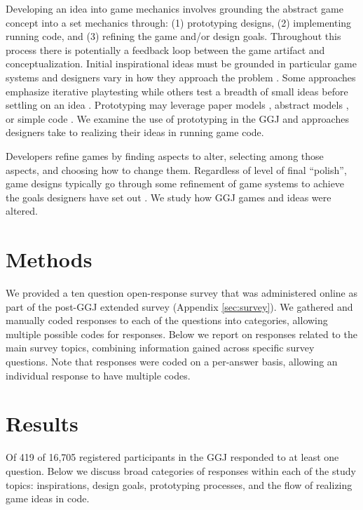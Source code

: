 \documentclass{sig-alternate}
\begin{document}
Developing an idea into game mechanics involves grounding the abstract game concept into a set mechanics through: (1) prototyping designs, (2) implementing running code, and (3) refining the game and/or design goals. Throughout this process there is potentially a feedback loop between the game artifact and conceptualization. Initial inspirational ideas must be grounded in particular game systems and designers vary in how they approach the problem \cite{gabler2005:7day-prototype,manker2011:prototyping,nelson2009:reqanal}. Some approaches emphasize iterative playtesting \cite{fullerton2008:playcentric,schell2008:gamedesign} while others test a breadth of small ideas before settling on an idea \cite{gabler2005:7day-prototype}. Prototyping may leverage paper models \cite{manker2011:prototyping}, abstract models \cite{nelson2009:reqanal} \cite{dormans2011:machinations2}, or simple code \cite{gabler2005:7day-prototype}. We examine the use of prototyping in the GGJ and approaches designers take to realizing their ideas in running game code.

Developers refine games by finding aspects to alter, selecting among those aspects, and choosing how to change them. Regardless of level of final ``polish'', game designs typically go through some refinement of game systems to achieve the goals designers have set out \cite{fullerton2008:playcentric,schell2008:gamedesign}. We study how GGJ games and ideas were altered.


\section{Methods}
We provided a ten question open-response survey that was administered online as part of the post-GGJ extended survey (Appendix \ref{sec:survey}). We gathered and manually coded responses to each of the questions into categories, allowing multiple possible codes for responses. Below we report on responses related to the main survey topics, combining information gained across specific survey questions. Note that responses were coded on a per-answer basis, allowing an individual response to have multiple codes.


\section{Results}
Of 419 of 16,705 registered participants in the GGJ responded to at least one question.
Below we discuss broad categories of responses within each of the study topics: inspirations, design goals, prototyping processes, and the flow of realizing game ideas in code.
\end{document}
